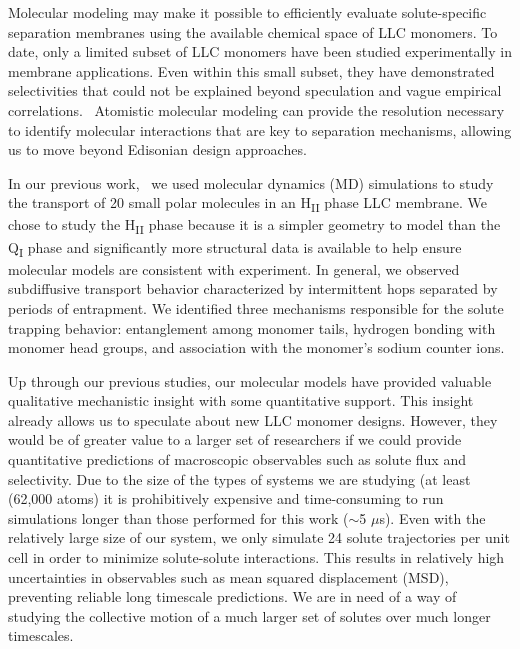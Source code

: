 \documentclass[aps,pre,preprint,groupedaddress,longbibliography]{revtex4-2}
\begin{document}
  Molecular modeling may make it possible to efficiently evaluate solute-specific separation
  membranes using the available chemical space of LLC monomers. To date, only a limited 
  subset of LLC monomers have been studied experimentally in membrane applications.
  \cite{carter_glycerol-based_2012,hatakeyama_nanoporous_2010,smith_ordered_1997,zhou_assembly_2003,resel_structural_2000}
  Even within this small subset, they have demonstrated selectivities that could not be
  explained beyond speculation and vague empirical correlations.~\cite{dischinger_application_2017}
  Atomistic molecular modeling can provide the resolution necessary to identify molecular 
  interactions that are key to separation mechanisms, allowing us to move beyond 
  Edisonian design approaches.

  In our previous work,~\cite{coscia_chemically_2019} we used molecular dynamics (MD) 
  simulations to study the transport of 20 small polar molecules in an H\textsubscript{II}
  phase LLC membrane. We chose to study the H\textsubscript{II} phase because it is
  a simpler geometry to model than the Q\textsubscript{I} phase and significantly more
  structural data is available to help ensure molecular models are consistent with experiment.
  In general, we observed subdiffusive transport behavior characterized by intermittent hops 
  separated by periods of entrapment. We identified three mechanisms responsible for the 
  solute trapping behavior: entanglement among monomer tails, hydrogen bonding with monomer
  head groups, and association with the monomer's sodium counter ions.
  
  Up through our previous studies, our molecular models have provided valuable 
  qualitative mechanistic insight with some quantitative support. This insight
  already allows us to speculate about new LLC monomer designs. However, they 
  would be of greater value to a larger set of researchers if we could provide 
  quantitative predictions of macroscopic observables such as solute flux and 
  selectivity. Due to the size of the types of systems we are studying (at least
  (62,000 atoms) it is prohibitively expensive and time-consuming to
  run simulations longer than those performed for this work ($\sim$5 $\mu$s). 
  Even with the relatively large size of our system, we only simulate 24 solute trajectories per unit cell in order
  to minimize solute-solute interactions. This results in relatively high uncertainties
  in observables such as mean squared displacement (MSD), preventing reliable long
  timescale predictions. We are in need of a way of studying the collective motion
  of a much larger set of solutes over much longer timescales.
  
\end{document}
